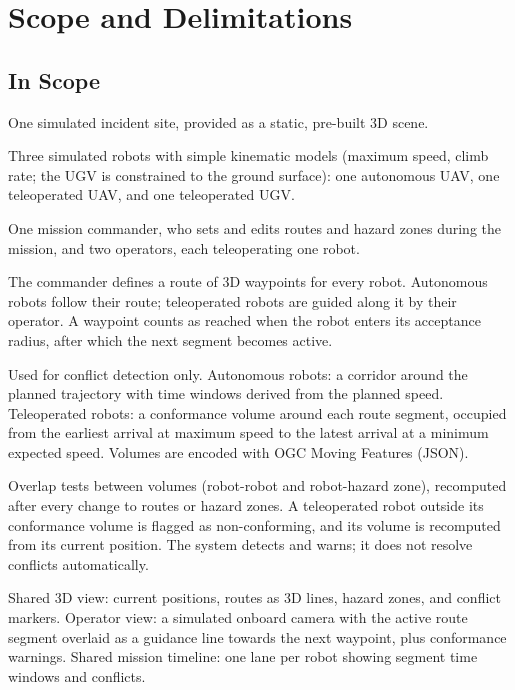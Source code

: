 \documentclass{article}
\begin{document}
\section{Scope and Delimitations}

\subsection{In Scope}
\begin{description}[style=nextline]
  \item[Scenario] One simulated incident site, provided as a static, pre-built 3D scene.
  \item[Robots] Three simulated robots with simple kinematic models (maximum speed, climb rate; the UGV is constrained to the ground surface): one autonomous UAV, one teleoperated UAV, and one teleoperated UGV.
  \item[Roles] One mission commander, who sets and edits routes and hazard zones during the mission, and two operators, each teleoperating one robot.
  \item[Planned routes] The commander defines a route of 3D waypoints for every robot. Autonomous robots follow their route; teleoperated robots are guided along it by their operator. A waypoint counts as reached when the robot enters its acceptance radius, after which the next segment becomes active.
  \item[4D volumes (not rendered)] Used for conflict detection only. Autonomous robots: a corridor around the planned trajectory with time windows derived from the planned speed. Teleoperated robots: a conformance volume around each route segment, occupied from the earliest arrival at maximum speed to the latest arrival at a minimum expected speed. Volumes are encoded with OGC Moving Features (JSON).
  \item[Conflict detection] Overlap tests between volumes (robot-robot and robot-hazard zone), recomputed after every change to routes or hazard zones. A teleoperated robot outside its conformance volume is flagged as non-conforming, and its volume is recomputed from its current position. The system detects and warns; it does not resolve conflicts automatically.
  \item[Communication to users] Shared 3D view: current positions, routes as 3D lines, hazard zones, and conflict markers. Operator view: a simulated onboard camera with the active route segment overlaid as a guidance line towards the next waypoint, plus conformance warnings. Shared mission timeline: one lane per robot showing segment time windows and conflicts.

\end{description}
\end{document}
